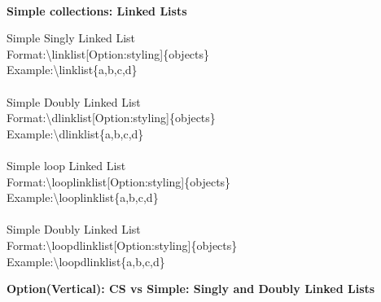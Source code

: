 \documentclass{article}
\begin{document}
\begin{adjustbox}{width=0.5\paperwidth,center,keepaspectratio}
\end{adjustbox}\\
\newpage
\begin{center}
\textbf{{\Large Simple collections: Linked Lists}}
\end{center}
Simple Singly Linked List\\
Format:{\textbackslash}linklist[Option:styling]{\{}objects{\}}\\
Example:{\textbackslash}linklist{\{}a,b,c,d{\}} \newline \\
\begin{adjustbox}{width=0.5\paperwidth,center,keepaspectratio}
\end{adjustbox}\\
Simple Doubly Linked List\\
Format:{\textbackslash}dlinklist[Option:styling]{\{}objects{\}}\\
Example:{\textbackslash}dlinklist{\{}a,b,c,d{\}} \newline \\
\begin{adjustbox}{width=0.5\paperwidth,center,keepaspectratio}
\end{adjustbox}\\
Simple loop Linked List\\
Format:{\textbackslash}looplinklist[Option:styling]{\{}objects{\}}\\
Example:{\textbackslash}looplinklist{\{}a,b,c,d{\}} \newline \\
\begin{adjustbox}{width=0.5\paperwidth,center,keepaspectratio}
\end{adjustbox}\\
Simple Doubly Linked List\\
Format:{\textbackslash}loopdlinklist[Option:styling]{\{}objects{\}}\\
Example:{\textbackslash}loopdlinklist{\{}a,b,c,d{\}} \newline \\
\begin{adjustbox}{width=0.5\paperwidth,center,keepaspectratio}
\end{adjustbox}
\newpage
\begin{center}
\textbf{{\Large Option(Vertical): CS vs Simple: Singly and Doubly Linked Lists}}
\end{center}
\end{document}

